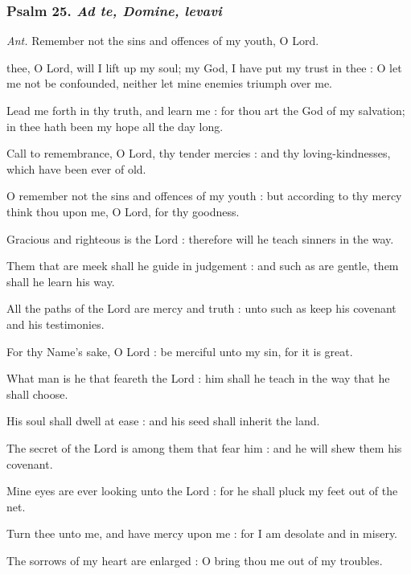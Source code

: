 \subsubsection{Psalm 25. \textit{Ad te, Domine, levavi}}\par\noindent
\textit{Ant.} Remember not {\dag} the sins and offences of my youth, O Lord.\par
{} thee, O Lord, will I lift up my soul; my God, I have put my trust in thee : O let me not be confounded, neither let mine enemies triumph over me.\par
{}
Lead me forth in thy truth, and learn me : for thou art the God of my salvation; in thee hath been my hope all the day long.\par
{}Call to remembrance, O Lord, thy tender mercies : and thy loving-kindnesses, which have been ever of old.\par
{}O remember not the sins and offences of my youth : but according to thy mercy think thou upon me, O Lord, for thy goodness.\par
{}Gracious and righteous is the Lord : therefore will he teach sinners in the way.\par
{}Them that are meek shall he guide in judgement : and such as are gentle, them shall he learn his way.\par
{}All the paths of the Lord are mercy and truth : unto such as keep his covenant and his testimonies.\par
{}For thy Name's sake, O Lord : be merciful unto my sin, for it is great.\par
{}What man is he that feareth the Lord : him shall he teach in the way that he shall choose.\par
{}His soul shall dwell at ease : and his seed shall inherit the land.\par
{}The secret of the Lord is among them that fear him : and he will shew them his covenant.\par
{}Mine eyes are ever looking unto the Lord : for he shall pluck my feet out of the net.\par
{}Turn thee unto me, and have mercy upon me : for I am desolate and in misery.\par
{}The sorrows of my heart are enlarged : O bring thou me out of my troubles.\par

